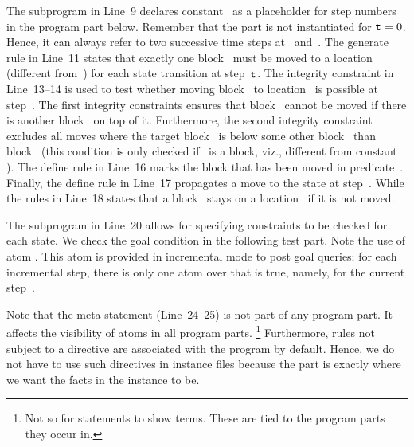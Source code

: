 The  subprogram in Line~9 declares constant~ as a placeholder for step numbers in the program part below.
Remember that the  part is not instantiated for $\texttt{t}=0$.
Hence, it can always refer to two successive time steps at~ and~.
The generate rule in Line~11 states that exactly one block~ must be moved to a location~ (different from~) 
for each state transition at step~$\texttt{t}$.
The integrity constraint in Line~13--14 is used to test whether moving block~ to location~ is possible at step~.
The first integrity constraints ensures that block~ cannot be moved if there is another block~ on top of it.
Furthermore, the second integrity constraint excludes all moves where the target block~ is below some other block~ than block~
(this condition is only checked if~ is a block, viz., different from constant ).
The define rule in Line~16 marks the block that has been moved in predicate~.
Finally, the define rule in Line~17 propagates a move to the state at step~.
While the rules in Line~18 states 
that a block~ stays on a location~ if it is not moved.

The subprogram  in Line~20 
allows for specifying constraints to be checked for each state.
We check the goal condition in the following test part.
Note the use of atom .
This atom is provided in incremental mode to post goal queries;
for each incremental step, there is only one atom over  that is true,
namely,  for the current step~.

Note that the  meta-statement (Line~24--25)
is not part of any program part.
It affects the visibility of atoms in all program parts.%
\footnote{Not so for  statements to show terms.
These are tied to the program parts they occur in.}
Furthermore, rules not subject to a  directive are associated with the  program by default.
Hence, we do not have to use such directives in instance files
because the  part is exactly where we want the facts in the instance to be.

